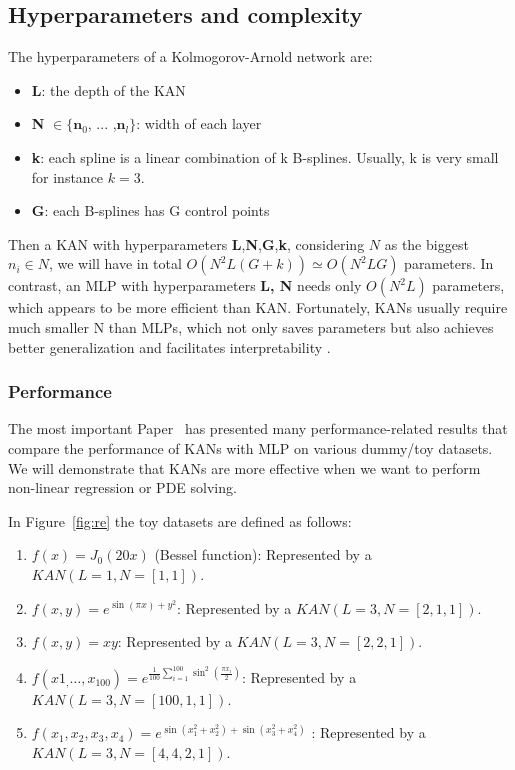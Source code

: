 \subsection{Hyperparameters and complexity}
The hyperparameters of a Kolmogorov-Arnold network are:
\begin{itemize}
    \item \textbf{L}: the depth of the KAN
    \item \textbf{N} $ \in \{\textbf{n}_0$, ... ,$\textbf{n}_l\}$: width of each layer
    \item \textbf{k}: each spline is a linear combination of k B-splines. Usually, k is very small for instance $k=3$.
    \item \textbf{G}: each B-splines has G control points
\end{itemize}

Then a KAN with hyperparameters \textbf{L},\textbf{N},\textbf{G},\textbf{k}, considering $N$ as the biggest $n_i \in N$, we will have in total $O(N^2L(G + k))  \simeq O(N^2LG)$ parameters. In contrast, an MLP with hyperparameters \textbf{L, N} needs only  $O(N^2L)$ parameters, which appears to be more efficient than KAN. Fortunately, KANs usually require much smaller N than MLPs, which not only saves parameters but also achieves better generalization and facilitates interpretability \cite{KAN}. 

\subsubsection{Performance}
The most important Paper~\cite{KAN} has presented many performance-related results that compare the performance of KANs with MLP on various dummy/toy datasets. We will demonstrate that KANs are more effective when we want to perform non-linear regression or PDE solving.

In Figure~\ref{fig:re} the toy datasets are defined as follows:
\begin{enumerate}
    \item $f(x) = J_0(20x)$ (Bessel function): Represented by a $KAN(L=1,N=[1,1])$.
    \item $f(x, y) = e^{\sin(\pi x)+y^2}$: Represented by a $KAN(L=3,N=[2, 1, 1])$.
    \item $f(x, y) = xy$: Represented by a $KAN(L=3,N=[2, 2, 1])$.
    \item $f(x1_,\dots , x_{100}) = e^{\frac{1}{100} 
    \sum_{i=1}^{100} \sin^2(\frac{\pi x_i}{2})}$: Represented by a $KAN(L=3,N=[100, 1, 1])$.

    \item $f(x_1, x_2, x_3, x_4) = e^ {\sin(x_1^2 + x_2^2)+ \sin(x_3^2 + x_4^2)}$ : Represented by a $KAN(L=3,N=[4,4, 2, 1])$.
\end{enumerate}

